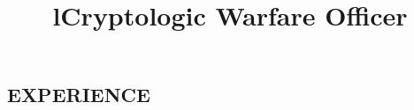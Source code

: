 \documentclass[line, margin]{resume}
\begin{document}
\address{20 Rhode Island Dr \\ Newport, RI 02840 \\ (203) 376-9329}
\address{http://russellshomberg.com \\ LinkedIn \\ russellshomberg@gmail.com}

\begin{resume}

  \section{EXPERIENCE}
  
  \begin{format}
    \title{l}\\
    \\
    \body\\
    \\
  \end{format}
  
  \title{Cryptologic Warfare Officer}
  

\end{resume}
\end{document}
